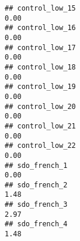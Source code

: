 \documentclass[
]{article}
\begin{document}
\begin{verbatim}
## control_low_15                                                                                                                                                                                                               0.00
## control_low_16                                                                                                                                                                                                               0.00
## control_low_17                                                                                                                                                                                                               0.00
## control_low_18                                                                                                                                                                                                               0.00
## control_low_19                                                                                                                                                                                                               0.00
## control_low_20                                                                                                                                                                                                               0.00
## control_low_21                                                                                                                                                                                                               0.00
## control_low_22                                                                                                                                                                                                               0.00
## sdo_french_1                                                                                                                                                                                                                 0.00
## sdo_french_2                                                                                                                                                                                                                 1.48
## sdo_french_3                                                                                                                                                                                                                 2.97
## sdo_french_4                                                                                                                                                                                                                 1.48

\end{verbatim}
\end{document}
